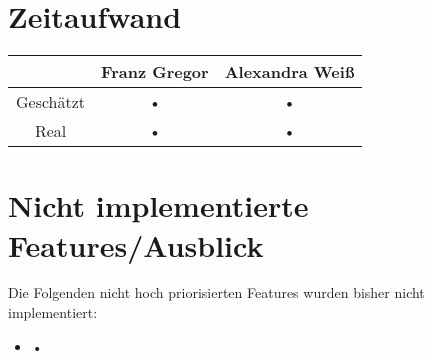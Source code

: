 \documentclass[a4paper,draft]{scrartcl}
\begin{document}
\section{Zeitaufwand}
\begin{tabular}{|c|c|c|}
\hline \rule[-2ex]{0pt}{5.5ex}  & Franz Gregor & Alexandra Weiß \\ 
\hline \rule[-2ex]{0pt}{5.5ex} Geschätzt & • & • \\ 
\hline \rule[-2ex]{0pt}{5.5ex} Real & • & • \\ 
\hline 
\end{tabular} 

\section{Nicht implementierte Features/Ausblick}
Die Folgenden nicht hoch priorisierten Features wurden bisher nicht 
implementiert:
\begin{itemize}
\item •
\end{itemize}
\end{document}
